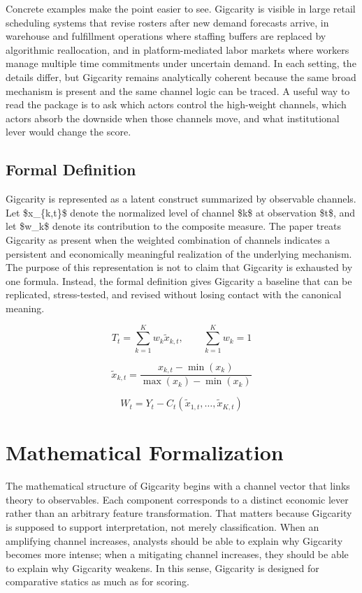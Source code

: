 \documentclass[12pt]{article}
\begin{document}
Concrete examples make the point easier to see. Gigcarity is visible in large retail scheduling systems that revise rosters after new demand forecasts arrive, in warehouse and fulfillment operations where staffing buffers are replaced by algorithmic reallocation, and in platform-mediated labor markets where workers manage multiple time commitments under uncertain demand. In each setting, the details differ, but Gigcarity remains analytically coherent because the same broad mechanism is present and the same channel logic can be traced. A useful way to read the package is to ask which actors control the high-weight channels, which actors absorb the downside when those channels move, and what institutional lever would change the score.

\subsection{Formal Definition}
Gigcarity is represented as a latent construct summarized by observable channels. Let \$x\_\{k,t\}\$ denote the normalized level of channel \$k\$ at observation \$t\$, and let \$w\_k\$ denote its contribution to the composite measure. The paper treats Gigcarity as present when the weighted combination of channels indicates a persistent and economically meaningful realization of the underlying mechanism. The purpose of this representation is not to claim that Gigcarity is exhausted by one formula. Instead, the formal definition gives Gigcarity a baseline that can be replicated, stress-tested, and revised without losing contact with the canonical meaning.

\begin{equation}
T_t = \sum_{k=1}^K w_k \tilde{x}_{k,t}, \qquad \sum_{k=1}^K w_k = 1
\label{eq:index}
\end{equation}

\begin{equation}
\tilde{x}_{k,t} = \frac{x_{k,t} - \min(x_k)}{\max(x_k) - \min(x_k)}
\label{eq:norm}
\end{equation}

\begin{equation}
W_t = Y_t - C_t(\tilde{x}_{1,t}, \dots, \tilde{x}_{K,t})
\label{eq:welfare}
\end{equation}

\section{Mathematical Formalization}
The mathematical structure of Gigcarity begins with a channel vector that links theory to observables. Each component corresponds to a distinct economic lever rather than an arbitrary feature transformation. That matters because Gigcarity is supposed to support interpretation, not merely classification. When an amplifying channel increases, analysts should be able to explain why Gigcarity becomes more intense; when a mitigating channel increases, they should be able to explain why Gigcarity weakens. In this sense, Gigcarity is designed for comparative statics as much as for scoring.
\end{document}
